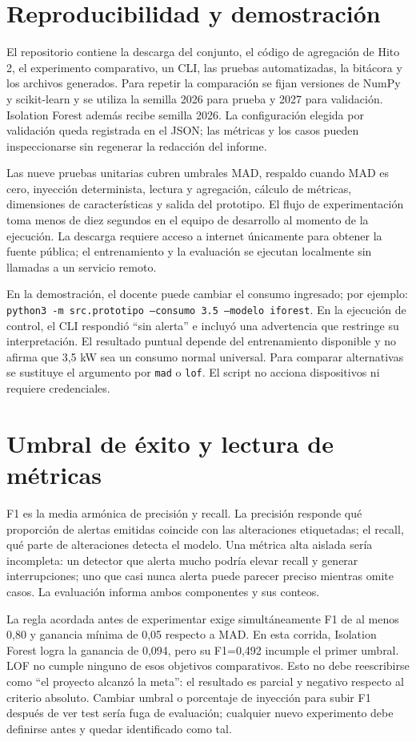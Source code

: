 \documentclass[10pt,twocolumn]{article}
\begin{document}
\section{Reproducibilidad y demostración}
El repositorio contiene la descarga del conjunto, el código de agregación de Hito 2, el experimento comparativo, un CLI, las pruebas automatizadas, la bitácora y los archivos generados. Para repetir la comparación se fijan versiones de NumPy y scikit-learn y se utiliza la semilla 2026 para prueba y 2027 para validación. Isolation Forest además recibe semilla 2026. La configuración elegida por validación queda registrada en el JSON; las métricas y los casos pueden inspeccionarse sin regenerar la redacción del informe.

Las nueve pruebas unitarias cubren umbrales MAD, respaldo cuando MAD es cero, inyección determinista, lectura y agregación, cálculo de métricas, dimensiones de características y salida del prototipo. El flujo de experimentación toma menos de diez segundos en el equipo de desarrollo al momento de la ejecución. La descarga requiere acceso a internet únicamente para obtener la fuente pública; el entrenamiento y la evaluación se ejecutan localmente sin llamadas a un servicio remoto.

En la demostración, el docente puede cambiar el consumo ingresado; por ejemplo: \texttt{python3 -m src.prototipo --consumo 3.5 --modelo iforest}. En la ejecución de control, el CLI respondió “sin alerta” e incluyó una advertencia que restringe su interpretación. El resultado puntual depende del entrenamiento disponible y no afirma que 3,5 kW sea un consumo normal universal. Para comparar alternativas se sustituye el argumento por \texttt{mad} o \texttt{lof}. El script no acciona dispositivos ni requiere credenciales.

\section{Umbral de éxito y lectura de métricas}
F1 es la media armónica de precisión y recall. La precisión responde qué proporción de alertas emitidas coincide con las alteraciones etiquetadas; el recall, qué parte de alteraciones detecta el modelo. Una métrica alta aislada sería incompleta: un detector que alerta mucho podría elevar recall y generar interrupciones; uno que casi nunca alerta puede parecer preciso mientras omite casos. La evaluación informa ambos componentes y sus conteos.

La regla acordada antes de experimentar exige simultáneamente F1 de al menos 0,80 y ganancia mínima de 0,05 respecto a MAD. En esta corrida, Isolation Forest logra la ganancia de 0,094, pero su F1=0,492 incumple el primer umbral. LOF no cumple ninguno de esos objetivos comparativos. Esto no debe reescribirse como “el proyecto alcanzó la meta”: el resultado es parcial y negativo respecto al criterio absoluto. Cambiar umbral o porcentaje de inyección para subir F1 después de ver test sería fuga de evaluación; cualquier nuevo experimento debe definirse antes y quedar identificado como tal.
\end{document}
